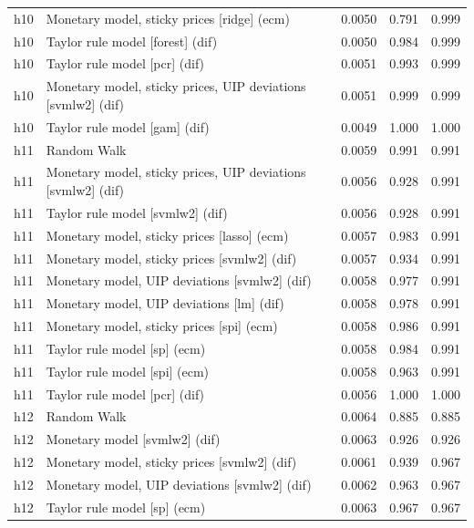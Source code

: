\begin{ThreePartTable}
\begin{longtable}[t]{cp{5.5cm}ccc}
h10 & \raggedright Monetary model, sticky prices [ridge] (ecm) & 0.0050 & 0.791 & 0.999\\
h10 & \raggedright Taylor rule model [forest] (dif) & 0.0050 & 0.984 & 0.999\\
h10 & \raggedright Taylor rule model [pcr] (dif) & 0.0051 & 0.993 & 0.999\\
h10 & \raggedright Monetary model, sticky prices, UIP deviations [svmlw2] (dif) & 0.0051 & 0.999 & 0.999\\
h10 & \raggedright Taylor rule model [gam] (dif) & 0.0049 & 1.000 & 1.000\\
\addlinespace
h11 & \raggedright Random Walk & 0.0059 & 0.991 & 0.991\\
h11 & \raggedright Monetary model, sticky prices, UIP deviations [svmlw2] (dif) & 0.0056 & 0.928 & 0.991\\
h11 & \raggedright Taylor rule model [svmlw2] (dif) & 0.0056 & 0.928 & 0.991\\
h11 & \raggedright Monetary model, sticky prices [lasso] (ecm) & 0.0057 & 0.983 & 0.991\\
h11 & \raggedright Monetary model, sticky prices [svmlw2] (dif) & 0.0057 & 0.934 & 0.991\\
h11 & \raggedright Monetary model, UIP deviations [svmlw2] (dif) & 0.0058 & 0.977 & 0.991\\
h11 & \raggedright Monetary model, UIP deviations [lm] (dif) & 0.0058 & 0.978 & 0.991\\
h11 & \raggedright Monetary model, sticky prices [spi] (ecm) & 0.0058 & 0.986 & 0.991\\
h11 & \raggedright Taylor rule model [sp] (ecm) & 0.0058 & 0.984 & 0.991\\
h11 & \raggedright Taylor rule model [spi] (ecm) & 0.0058 & 0.963 & 0.991\\
h11 & \raggedright Taylor rule model [pcr] (dif) & 0.0056 & 1.000 & 1.000\\
\addlinespace
h12 & \raggedright Random Walk & 0.0064 & 0.885 & 0.885\\
h12 & \raggedright Monetary model [svmlw2] (dif) & 0.0063 & 0.926 & 0.926\\
h12 & \raggedright Monetary model, sticky prices [svmlw2] (dif) & 0.0061 & 0.939 & 0.967\\
h12 & \raggedright Monetary model, UIP deviations [svmlw2] (dif) & 0.0062 & 0.963 & 0.967\\
h12 & \raggedright Taylor rule model [sp] (ecm) & 0.0063 & 0.967 & 0.967\\

\end{longtable}
\end{ThreePartTable}
